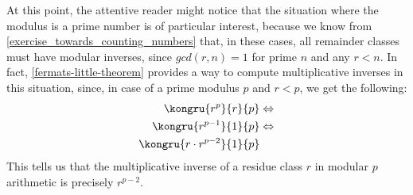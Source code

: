 At this point, the attentive reader might notice that the situation where the modulus is a prime number is of particular interest, because we know from \exercisename{} \ref{exercise_towards_counting_numbers} that, in these cases, all remainder classes must have modular inverses, since $gcd(r,n)=1$ for prime $n$ and any $r<n$. In fact,  \eqref{fermats-little-theorem} provides a way to compute multiplicative inverses in this situation, since, in case of a prime modulus $p$ and $r<p$, we get the following:
\begin{align*}
\kongru{r^p}{r}{p} & \Leftrightarrow \\
\kongru{r^{p-1}}{1}{p} & \Leftrightarrow \\
\kongru{r\cdot r^{p-2}}{1}{p}
\end{align*}
This tells us that the multiplicative inverse of a residue class $r$ in modular $p$ arithmetic is precisely $r^{p-2}$.
